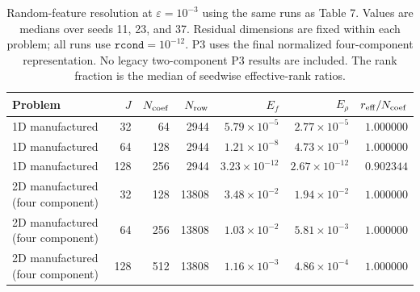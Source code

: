 \begin{table}[t]
\centering
\caption{Random-feature resolution at $\varepsilon=10^{-3}$ using the same runs as Table 7. Values are medians over seeds 11, 23, and 37. Residual dimensions are fixed within each problem; all runs use $\texttt{rcond}=10^{-12}$. P3 uses the final normalized four-component representation. No legacy two-component P3 results are included. The rank fraction is the median of seedwise effective-rank ratios.}
\label{tab:feature-resolution}
\begin{tabular}{lrrrrrr}
\toprule
Problem & $J$ & $N_{\rm coef}$ & $N_{\rm row}$ & $E_f$ & $E_\rho$ & $r_{\rm eff}/N_{\rm coef}$\\
\midrule
1D manufactured & 32 & 64 & 2944 & $5.79\times10^{-5}$ & $2.77\times10^{-5}$ & $1.000000$\\
1D manufactured & 64 & 128 & 2944 & $1.21\times10^{-8}$ & $4.73\times10^{-9}$ & $1.000000$\\
1D manufactured & 128 & 256 & 2944 & $3.23\times10^{-12}$ & $2.67\times10^{-12}$ & $0.902344$\\
2D manufactured (four component) & 32 & 128 & 13808 & $3.48\times10^{-2}$ & $1.94\times10^{-2}$ & $1.000000$\\
2D manufactured (four component) & 64 & 256 & 13808 & $1.03\times10^{-2}$ & $5.81\times10^{-3}$ & $1.000000$\\
2D manufactured (four component) & 128 & 512 & 13808 & $1.16\times10^{-3}$ & $4.86\times10^{-4}$ & $1.000000$\\
\bottomrule
\end{tabular}
\end{table}
